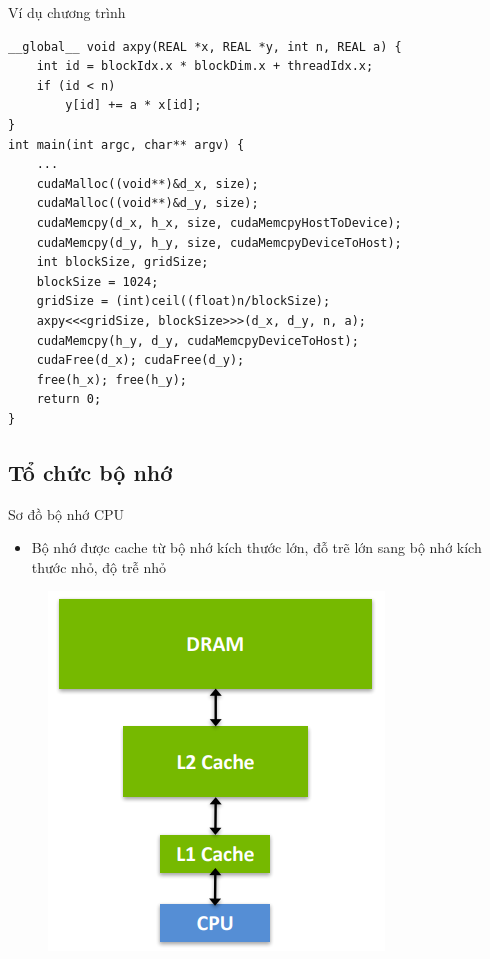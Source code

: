 \documentclass[10pt]{beamer}
\theoremstyle{remark}
\numberwithin{algocf}{section}
\numberwithin{equation}{section}
\numberwithin{dl}{section}
\numberwithin{figure}{section}
\begin{document}
\begin{frame}[fragile]{Ví dụ chương trình}
\begin{verbatim}
__global__ void axpy(REAL *x, REAL *y, int n, REAL a) {
    int id = blockIdx.x * blockDim.x + threadIdx.x;
    if (id < n)
        y[id] += a * x[id];
}
int main(int argc, char** argv) {
    ...
    cudaMalloc((void**)&d_x, size);
    cudaMalloc((void**)&d_y, size);
    cudaMemcpy(d_x, h_x, size, cudaMemcpyHostToDevice);
    cudaMemcpy(d_y, h_y, size, cudaMemcpyDeviceToHost);
    int blockSize, gridSize;
    blockSize = 1024;
    gridSize = (int)ceil((float)n/blockSize);
    axpy<<<gridSize, blockSize>>>(d_x, d_y, n, a);
    cudaMemcpy(h_y, d_y, cudaMemcpyDeviceToHost);
    cudaFree(d_x); cudaFree(d_y);
    free(h_x); free(h_y);
    return 0;
}
\end{verbatim}
    
\end{frame}

\subsection{Tổ chức bộ nhớ}

\begin{frame}{Sơ đồ bộ nhớ CPU}
    \begin{itemize}
        \item Bộ nhớ được cache từ bộ nhớ kích thước lớn, đỗ trẽ lớn sang bộ nhớ kích thước nhỏ, độ trễ nhỏ
    \end{itemize}

    \begin{figure}[H]
        \centering
        \includegraphics[height=0.6\textheight]{figures/CUDA/CPU_Memory_Hierachy.png}
    \end{figure}
\end{frame}
\end{document}
